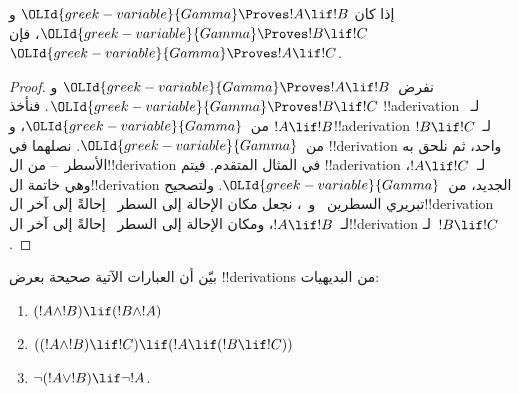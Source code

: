 \documentclass[../../../include/open-logic-section]{subfiles}
\begin{document}
\begin{prop}
   إذا كان $\OLId{greek-variable}{Gamma} \Proves !A \lif !B$ و$\OLId{greek-variable}{Gamma}
  \Proves !B \lif !C$، فإن $\OLId{greek-variable}{Gamma} \Proves !A \lif !C$.
\end{prop}

\begin{proof}
  نفرض~$\OLId{greek-variable}{Gamma} \Proves !A \lif !B$ و$\OLId{greek-variable}{Gamma} \Proves !B \lif
  !C$. فنأخذ !!a{derivation} لـ~$!A \lif !B$ من~$\OLId{greek-variable}{Gamma}$،
  و!!a{derivation} لـ~$!B \lif !C$ من~$\OLId{greek-variable}{Gamma}$.
  نصلهما في !!{derivation} واحد، ثم نلحق به الأسطر~--
  من ال!!{derivation} في المثال المتقدم. فيتم !!a{derivation}
  لـ~$!A \lif !C$، وهي خاتمة ال!!{derivation} الجديد،
  من~$\OLId{greek-variable}{Gamma}$. ولتصحيح تبريري السطرين~ و~، نجعل مكان الإحالة
  إلى السطر~ إحالةً إلى آخر ال!!{derivation} لـ~$!A
  \lif !B$، ومكان الإحالة إلى السطر~ إحالةً إلى آخر
  ال!!{derivation} لـ~$!B \lif !C$.
\end{proof}

\begin{prob}
بيّن أن العبارات الآتية صحيحة بعرض !!{derivation}s من البديهيات:
\begin{enumerate}
\item $(!A \land !B) \lif (!B \land !A)$
\item $((!A \land !B) \lif !C) \lif (!A \lif (!B \lif !C))$
\item $\lnot(!A \lor !B) \lif \lnot !A$.
\end{enumerate}
\end{prob}
\end{document}

